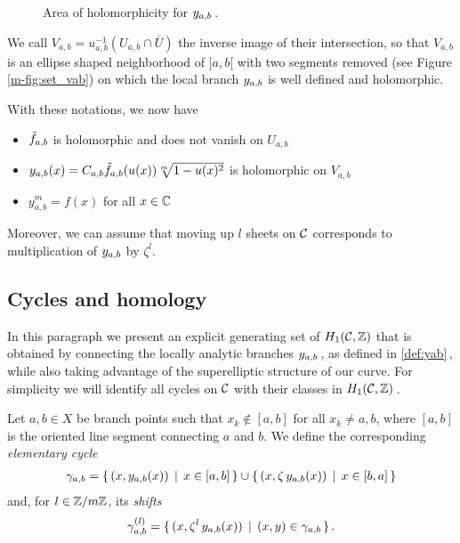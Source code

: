 \documentclass[main.tex]{subfiles}
\begin{document}
  \begin{figure}[H] \begin{center} 
  \end{center} \caption{Area of holomorphicity for $y_{a,b}$\,.}
  \label{fig:set_vab} \end{figure}

  We call $V_{a,b} = u_{a,b}^{-1}(U_{a,b}\cap \overline U)$ the inverse image of their intersection,
  so that $V_{a,b}$ is an ellipse shaped neighborhood of $]a,b[$ with two segments removed
      (see Figure \ref{m-fig:set_vab})
      on which the local branch $y_{a,b}$ is well defined and holomorphic.

  With these notations, we now have
  \begin{prop}
     \begin{itemize}
         \item $\tilde{f}_{a,b}$ is holomorphic and does not vanish on $U_{a,b}$
         \item $y_{a,b}(x) = C_{a,b} \tilde{f}_{a,b}(u(x)) \sqrt[m]{1-u(x)^2}$ is holomorphic
         on $V_{a,b}$
         \item $y_{a,b}^m = f(x)$ for all $x\in\mathbb{C}$
     \end{itemize} 
     Moreover, we can assume that moving up $l$ sheets on $\mathcal{C}$
     corresponds to multiplication of $y_{a,b}$ by $\zeta^l$. 
 \end{prop}


  \subsection{Cycles and homology}\label{subsec:cycles_homo}
    
   In this paragraph we present an explicit generating set of $H_1(\mathcal{C},\mathbb{Z})$ that is obtained by connecting the locally analytic branches $y_{a,b}$\,, as defined in \eqref{def:yab}\,,
   while also taking advantage of the superelliptic structure of our curve.
   For simplicity we will identify all cycles on $\mathcal{C}$ with their classes in $H_1(\mathcal{C},\mathbb{Z})$\,.
   
   \begin{defn}\label{def:elem_cycle}
   Let $a, b \in X$ be branch points such that $x_k \not\in [a,b]$ for all $x_k \ne a,b$, where  $[a,b]$ is the oriented line segment connecting $a$ and $b$.  
   We define the corresponding \textit{elementary cycle} 
   \begin{align}
    \gamma_{a,b} = \{ \, (x,y_{a,b}(x)) \, \mid \, x \in [a,b] \, \} \cup \{ \,(x,\zeta \, y_{a,b}(x)) \, \mid \, x \in [b,a] \, \}
   \end{align}
   and, for $l \in \mathbb{Z}/m\mathbb{Z}$, its \textit{shifts}
   \begin{align}
    \gamma_{a,b}^{(l)} = \{ \, (x,\zeta^l \,y_{a,b}(x)) \, \mid \, (x,y) \in \gamma_{a,b} \, \}\,. 
   \end{align}
    \end{defn}
    
\end{document}
